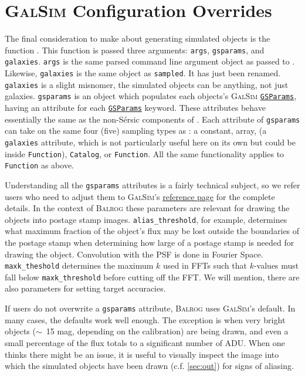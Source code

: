 \documentclass[11pt]{book}
\newcommand{\codett}[1]{\texttt{#1}}
\newcommand{\galsim}{\textsc{GalSim}}
\newcommand{\balrog}{\textsc{Balrog}}
\newcommand{\sersic}{S\'{e}rsic}
\begin{document}
\section{\galsim{} Configuration Overrides}
\label{sec:gsparams}

The final consideration to make about generating simulated objects is the function \gspfunc{}.
This function is passed three arguments: \codett{args}, \codett{gsparams}, and \codett{galaxies}.
\codett{args} is the same parsed command line argument object as passed to \simfunc{}.
Likewise, \codett{galaxies} is the same object as \codett{sampled}.
It has just been renamed.
\codett{galaxies} is a slight misnomer, the simulated objects can be anything, not just galaxies.
\codett{gsparams} is an object which populates each objects's \galsim{} 
\href{http://galsim-developers.github.io/GalSim/structgalsim\_1\_1\_g\_s\_params.html}{\texttt{GSParams}}, having an attribute for each  
\href{http://galsim-developers.github.io/GalSim/structgalsim\_1\_1\_g\_s\_params.html}{\texttt{GSParams}} keyword.
These attributes behave essentially the same as the non-\sersic{} components of \simrules{}.
Each attribute of \codett{gsparams} can take on the same four (five) sampling types as \simrules{}:
a constant, array, (a \codett{galaxies} attribute, which is not particularly useful here on its own but could be
inside \codett{Function}), \codett{Catalog}, or \codett{Function}.
All the same functionality applies to \codett{Function} as above.

Understanding all the \codett{gsparams} attributes is a fairly technical subject, so we
refer users who need to adjust them to 
\galsim{}'s \href{http://galsim-developers.github.io/GalSim/structgalsim\_1\_1\_g\_s\_params.html}{reference page}
for the complete details.
In the context of \balrog{} these parameters are relevant for drawing the objects into postage stamp images.
\codett{alias\_threshold}, for example, determines what maximum fraction of the object's flux may be lost outside the boundaries
of the postage stamp when determining how large of a postage stamp is needed for drawing the object.
Convolution with the PSF is done in Fourier Space.
\codett{maxk\_theshold} determines the maximum $k$ used in FFTs such that $k$-values must fall below \codett{maxk\_threshold}
before cutting off the FFT. We will mention, there are also parameters for setting target accuracies.

If users do not overwrite a \codett{gsparams} attribute, \balrog{} uses \galsim{}'s default.
In many cases, the defaults work well enough. The exception is when very bright objects ($\sim$~15 mag, depending on the calibration)
are being drawn, and even a small percentage of the flux totals to a significant number of ADU.
When one thinks there might be an issue, 
it is useful to visually inspect the image into which the simulated objects have been drawn (c.f. \autoref{sec:out})
for signs of aliasing.
\end{document}

